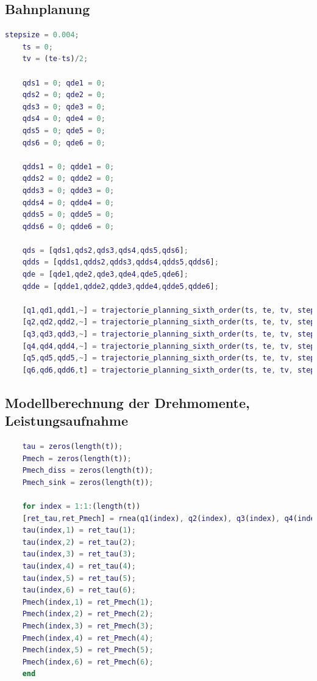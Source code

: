 \subsection{Bahnplanung}
%
\begin{lstlisting}[language=Matlab, numbers=none]
	stepsize = 0.004;
	ts = 0;
	tv = (te-ts)/2;
	
	qds1 = 0; qde1 = 0;
	qds2 = 0; qde2 = 0;
	qds3 = 0; qde3 = 0;
	qds4 = 0; qde4 = 0;
	qds5 = 0; qde5 = 0;
	qds6 = 0; qde6 = 0;
	
	qdds1 = 0; qdde1 = 0;
	qdds2 = 0; qdde2 = 0;
	qdds3 = 0; qdde3 = 0;
	qdds4 = 0; qdde4 = 0;
	qdds5 = 0; qdde5 = 0;
	qdds6 = 0; qdde6 = 0;
	
	qds = [qds1,qds2,qds3,qds4,qds5,qds6];
	qdds = [qdds1,qdds2,qdds3,qdds4,qdds5,qdds6];
	qde = [qde1,qde2,qde3,qde4,qde5,qde6];
	qdde = [qdde1,qdde2,qdde3,qdde4,qdde5,qdde6];
	
	[q1,qd1,qdd1,~] = trajectorie_planning_sixth_order(ts, te, tv, stepsize, qs(1), qds(1), qdds(1), qv(1), qe(1), qde(1), qdde(1));
	[q2,qd2,qdd2,~] = trajectorie_planning_sixth_order(ts, te, tv, stepsize, qs(2), qds(2), qdds(2), qv(2), qe(2), qde(2), qdde(2));
	[q3,qd3,qdd3,~] = trajectorie_planning_sixth_order(ts, te, tv, stepsize, qs(3), qds(3), qdds(3), qv(3), qe(3), qde(3), qdde(3));
	[q4,qd4,qdd4,~] = trajectorie_planning_sixth_order(ts, te, tv, stepsize, qs(4), qds(4), qdds(4), qv(4), qe(4), qde(4), qdde(4));
	[q5,qd5,qdd5,~] = trajectorie_planning_sixth_order(ts, te, tv, stepsize, qs(5), qds(5), qdds(5), qv(5), qe(5), qde(5), qdde(5));
	[q6,qd6,qdd6,t] = trajectorie_planning_sixth_order(ts, te, tv, stepsize, qs(6), qds(6), qdds(6), qv(6), qe(6), qde(6), qdde(6));
\end{lstlisting}
%
\subsection{Modellberechnung der Drehmomente, Leistungsaufnahme}
%
\begin{lstlisting}[language=Matlab, numbers=none]
	% Initialisierung
	tau = zeros(length(t));
	Pmech = zeros(length(t));
	Pmech_diss = zeros(length(t));
	Pmech_sink = zeros(length(t));
	
	for index = 1:1:(length(t))
	[ret_tau,ret_Pmech] = rnea(q1(index), q2(index), q3(index), q4(index), q5(index), q6(index), qd1(index), qd2(index), qd3(index), qd4(index), qd5(index), qd6(index), qdd1(index), qdd2(index), qdd3(index), qdd4(index), qdd5(index), qdd6(index));
	tau(index,1) = ret_tau(1);
	tau(index,2) = ret_tau(2);
	tau(index,3) = ret_tau(3);
	tau(index,4) = ret_tau(4);
	tau(index,5) = ret_tau(5);
	tau(index,6) = ret_tau(6);
	Pmech(index,1) = ret_Pmech(1);
	Pmech(index,2) = ret_Pmech(2);
	Pmech(index,3) = ret_Pmech(3);
	Pmech(index,4) = ret_Pmech(4);
	Pmech(index,5) = ret_Pmech(5);
	Pmech(index,6) = ret_Pmech(6);
	end
\end{lstlisting}
%
